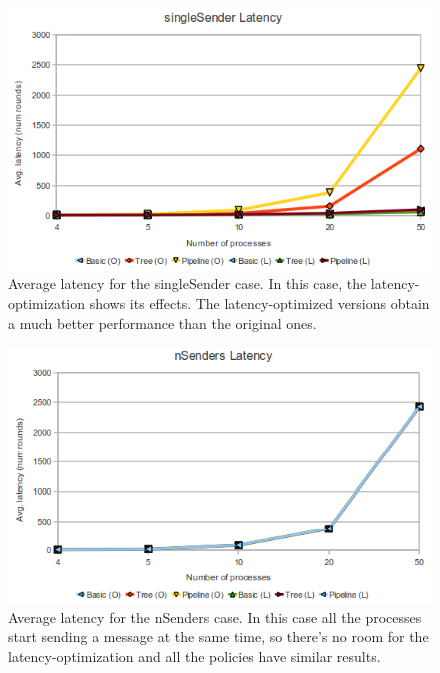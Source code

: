 \documentclass[a4paper, 11pt]{article}
\begin{document}
\begin{figure}[htp]
  \centering
  \includegraphics[scale=0.6]{avgLatSingleSender.png}
	\caption{Average latency for the singleSender case. In this case, the latency-optimization shows its effects. The latency-optimized versions obtain a much better performance than the original ones.}
  \label{fig:avgLatSingleSender}
\end{figure}

\begin{figure}[htp]
  \centering
  \includegraphics[scale=0.6]{avgLatNSenders.png}
	\caption{Average latency for the nSenders case. In this case all the processes start sending a message at the same time, so there's no room for the latency-optimization and all the policies have similar results.}
  \label{fig:avgLatNSenders}
\end{figure}
\end{document}
